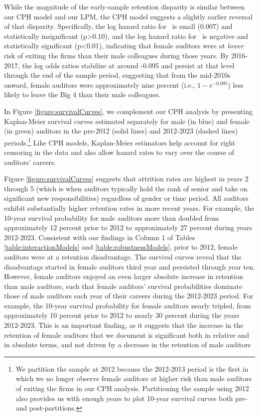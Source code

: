 \documentclass[11pt]{article}
\begin{document}
            While the magnitude of the early-sample retention disparity is similar between our CPH model and our LPM, the CPH model suggests a slightly earlier reversal of that disparity. Specifically, the log hazard ratio for \FEMALExXIItoXIII\ is small (0.007) and statistically insignificant (p>0.10), and the log hazard ratio for \FEMALExXIVtoXV\ is negative and statistically significant (p<0.01), indicating that female auditors were at \textit{lower} risk of exiting the firms than their male colleagues during those years. By 2016-2017, the log odds ratios stabilize at around -0.095 and persist at that level through the end of the sample period, suggesting that from the mid-2010s onward, female auditors were approximately nine percent (i.e., $1-e^{-0.095}$) less likely to leave the Big 4 than their male colleagues. 

            In Figure \ref{figure:survivalCurves}, we complement our CPH analysis by presenting Kaplan-Meier survival curves \parencite{kaplanNonparametricEstimationIncomplete1958} estimated separately for male (in blue) and female (in green) auditors in the pre-2012 (solid lines) and 2012-2023 (dashed lines) periods.\footnote{We partition the sample at 2012 because the 2012-2013 period is the first in which we no longer observe female auditors at higher risk than male auditors of exiting the firms in our CPH analysis. Partitioning the sample using 2012 also provides us with enough years to plot 10-year survival curves both pre- and post-partitions.} Like CPH models, Kaplan-Meier estimators help account for right censoring in the data and also allow hazard rates to vary over the course of auditors' careers. 
            
            Figure \ref{figure:survivalCurves} suggests that attrition rates are highest in years 2 through 5 (which is when auditors typically hold the rank of senior and take on significant new responsibilities) regardless of gender or time period. All auditors exhibit substantially higher retention rates in more recent years. For example, the 10-year survival probability for male auditors more than doubled from approximately 12 percent prior to 2012 to approximately 27 percent during years 2012-2023. Consistent with our findings in Column 1 of Tables \ref{table:interactionModels} and \ref{table:robustnessModels}, prior to 2012, female auditors were at a retention disadvantage. The survival curves reveal that the disadvantage started in female auditors third year and persisted through year ten. However, female auditors enjoyed an even larger absolute increase in retention than male auditors, such that female auditors' survival probabilities dominate those of male auditors each year of their careers during the 2012-2023 period. For example, the 10-year survival probability for female auditors nearly tripled, from approximately 10 percent prior to 2012 to nearly 30 percent during the years 2012-2023. This is an important finding, as it suggests that the increase in the retention of female auditors that we document is significant both in relative and in absolute terms, and not driven by a decrease in the retention of male auditors
        
\end{document}
